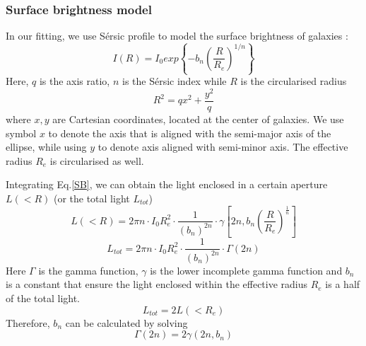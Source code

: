 \documentclass[fleqn,usenatbib]{mnras}
\begin{document}
\subsubsection{Surface brightness model}
\par In our fitting, we use S\'{e}rsic profile to model the surface brightness of galaxies :
\begin{equation}
    I(R) = I_0 exp\left\{-b_n\left(\frac{R}{R_e}\right)^{1/n}\right\}
    \label{SB}
\end{equation}
Here, $q$ is the axis ratio, $n$ is the S\'{e}rsic index while $R$ is the circularised radius
\begin{equation}
    R^2 = qx^2 + \frac{y^2}{q}
\end{equation}
where $x,y$ are Cartesian coordinates, located at the center of galaxies. We use symbol $x$ to denote the axis that is aligned with the semi-major axis of the ellipse, while using $y$ to denote axis aligned with semi-minor axis. The effective radius $R_e$ is circularised as well.
\par Integrating Eq.\ref{SB}, we can obtain the light enclosed in a certain aperture $L(<R)$ (or the total light $L_{tot}$)
\begin{equation}
    L(<R) = 2\pi n\cdot I_0R_e^2 \cdot \frac{1}{\left(b_n\right)^{2n}}\cdot \gamma\left[2n,b_n \left(\frac{R}{R_e}\right)^{\frac{1}{n}}\right]
\end{equation}
\begin{equation}
    L_{tot} = 2\pi n\cdot I_0R_e^2 \cdot \frac{1}{\left(b_n\right)^{2n}}\cdot \Gamma\left(2n\right)
\end{equation}
Here $\Gamma$ is the gamma function, $\gamma$ is the lower incomplete gamma function and $b_n$ is a constant that ensure the light enclosed within the effective radius $R_e$ is a half of the total light.
\begin{equation}
    L_{tot} = 2 L(<R_e)
\end{equation}
Therefore, $b_n$ can be calculated by solving
\begin{equation}
    \Gamma(2n) = 2\gamma(2n, b_n)
\end{equation}
\end{document}
